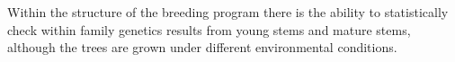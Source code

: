 Within the structure of the breeding program there is the ability to
statistically check within family genetics results from young stems and mature
stems, although the trees are grown under different environmental conditions.
